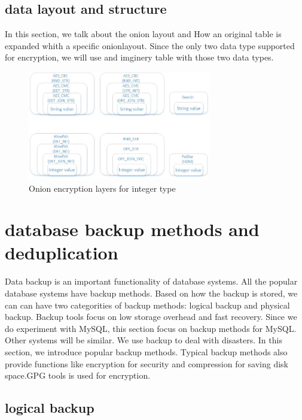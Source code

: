 \subsection{data layout and structure}

In this section, we talk about the onion layout and How an original table is expanded whith a specific onionlayout. Since the only two data type supported for encryption, we will use and imginery table with those two data types. 



\begin{figure}[tb]
\centering
\includegraphics[width=8cm]{images/Onions.jpg}
\caption{Onion encryption layers for integer type}
\label{fig:stack3}
\end{figure}


\section{database backup methods and deduplication}

Data backup is an important functionality of database systems. All the popular database systems have backup methods. Based on how the backup is stored, we can can have two categorities of backup methods: logical backup and physical backup. Backup tools focus on low storage overhead and fast recovery. Since we do experiment with MySQL, this section focus on backup methods for MySQL. Other systems will be similar. We use backup to deal with disasters. In this section, we introduce popular backup methods. Typical backup methods also provide functions like encryption for security and compression for saving disk space.GPG tools is used for encryption.



\subsection{logical backup}

